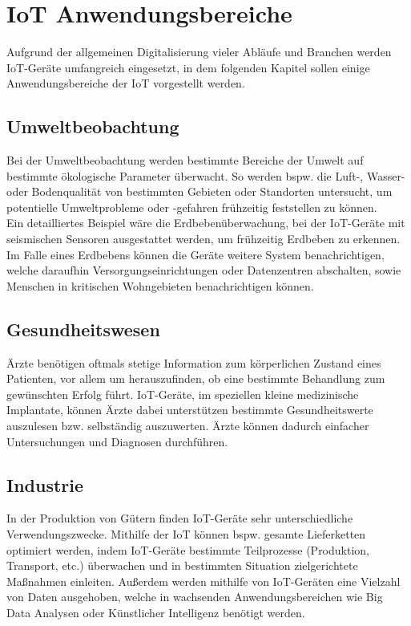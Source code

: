 \section{IoT Anwendungsbereiche}
Aufgrund der allgemeinen Digitalisierung vieler Abläufe und Branchen werden IoT-Geräte umfangreich eingesetzt,
in dem folgenden Kapitel sollen einige Anwendungsbereiche der IoT vorgestellt werden. 

\subsection{Umweltbeobachtung}
Bei der Umweltbeobachtung werden bestimmte Bereiche der Umwelt auf bestimmte ökologische Parameter überwacht. 
So werden bspw. die Luft-, Wasser- oder Bodenqualität von bestimmten Gebieten oder Standorten 
untersucht, um potentielle Umweltprobleme oder -gefahren frühzeitig feststellen zu können. \\

Ein detailliertes Beispiel wäre die Erdbebenüberwachung, bei der IoT-Geräte mit seismischen Sensoren
ausgestattet werden, um frühzeitig Erdbeben zu erkennen. Im Falle eines Erdbebens können die Geräte
weitere System benachrichtigen, welche daraufhin Versorgungseinrichtungen oder  Datenzentren
abschalten, sowie Menschen in kritischen Wohngebieten benachrichtigen können.

\subsection{Gesundheitswesen}
Ärzte benötigen oftmals stetige Information zum körperlichen Zustand eines Patienten, vor allem um
herauszufinden, ob eine bestimmte Behandlung zum gewünschten Erfolg führt. IoT-Geräte, im speziellen
kleine medizinische Implantate, können Ärzte dabei unterstützen bestimmte Gesundheitswerte auszulesen bzw. 
selbständig auszuwerten. Ärzte können dadurch einfacher Untersuchungen und Diagnosen durchführen.

\subsection{Industrie}
In der Produktion von Gütern finden IoT-Geräte sehr unterschiedliche Verwendungszwecke. Mithilfe der IoT können
bspw. gesamte Lieferketten optimiert werden, indem IoT-Geräte bestimmte Teilprozesse (Produktion, Transport, etc.)
überwachen und in bestimmten Situation zielgerichtete Maßnahmen einleiten. Außerdem werden mithilfe von IoT-Geräten eine 
Vielzahl von Daten ausgehoben, welche in wachsenden Anwendungsbereichen wie Big Data Analysen oder Künstlicher Intelligenz 
benötigt werden.

